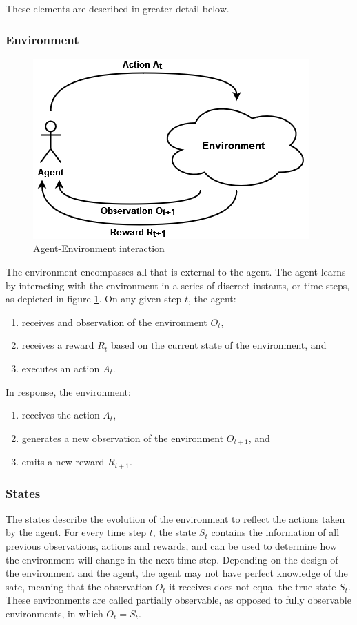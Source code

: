 These elements are described in greater detail below.

\subsubsection{Environment}

\begin{figure}[!h]
    \centering
    \includegraphics[width=.5\textwidth]{figs/RL_schema.png}
    \caption{Agent-Environment interaction}
    \label{fig:interaction}
\end{figure}

The environment encompasses all that is external to the agent. The agent learns by interacting with the environment in a series of discreet instants, or time steps, as depicted in figure \ref{fig:interaction}. On any given step $t$, the agent:

\begin{enumerate}
    \item receives and observation of the environment $O_t$,
    \item receives a reward $R_t$ based on the current state of the environment, and
    \item executes an action $A_t$.
\end{enumerate}

In response, the environment:

\begin{enumerate}
    \item receives the action $A_t$,
    \item generates a new observation of the environment $O_{t+1}$, and
    \item emits a new reward $R_{t+1}$.
\end{enumerate}

\subsubsection{States}

The states describe the evolution of the environment to reflect the actions taken by the agent. For every time step $t$, the state $S_t$ contains the information of all previous observations, actions and rewards, and can be used to determine how the environment will change in the next time step. Depending on the design of the environment and the agent, the agent may not have perfect knowledge of the sate, meaning that the observation $O_t$ it receives does not equal the true state $S_t$. These environments are called partially observable, as opposed to fully observable environments, in which $O_t = S_t$.

